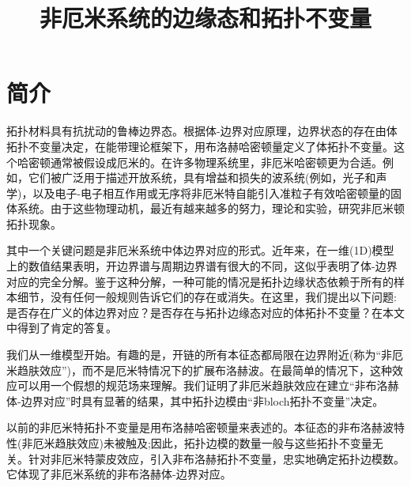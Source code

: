 \documentclass{article}
\begin{document}
\title{非厄米系统的边缘态和拓扑不变量}
\maketitle
\section{简介}
拓扑材料具有抗扰动的鲁棒边界态。根据体-边界对应原理，边界状态的存在由体拓扑不变量决定，在能带理论框架下，用布洛赫哈密顿量定义了体拓扑不变量。这个哈密顿通常被假设成厄米的。在许多物理系统里，非厄米哈密顿更为合适。例如，它们被广泛用于描述开放系统，具有增益和损失的波系统(例如，光子和声学)，以及电子-电子相互作用或无序将非厄米特自能引入准粒子有效哈密顿量的固体系统。由于这些物理动机，最近有越来越多的努力，理论和实验，研究非厄米顿拓扑现象。

其中一个关键问题是非厄米系统中体边界对应的形式。近年来，在一维(1D)模型上的数值结果表明，开边界谱与周期边界谱有很大的不同，这似乎表明了体-边界对应的完全分解。鉴于这种分解，一种可能的情况是拓扑边缘状态依赖于所有的样本细节，没有任何一般规则告诉它们的存在或消失。在这里，我们提出以下问题:是否存在广义的体边界对应？是否存在与拓扑边缘态对应的体拓扑不变量？在本文中得到了肯定的答复。

我们从一维模型开始。有趣的是，开链的所有本征态都局限在边界附近(称为“非厄米趋肤效应”)，而不是厄米特情况下的扩展布洛赫波。在最简单的情况下，这种效应可以用一个假想的规范场来理解。我们证明了非厄米趋肤效应在建立“非布洛赫体-边界对应”时具有显著的结果，其中拓扑边模由“非bloch拓扑不变量”决定。

以前的非厄米特拓扑不变量是用布洛赫哈密顿量来表述的。本征态的非布洛赫波特性(非厄米趋肤效应)未被触及;因此，拓扑边模的数量一般与这些拓扑不变量无关。针对非厄米特蒙皮效应，引入非布洛赫拓扑不变量，忠实地确定拓扑边模数。它体现了非厄米系统的非布洛赫体-边界对应。
\end{document}
